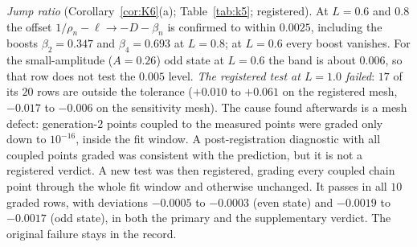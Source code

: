 \documentclass[11pt]{amsart}
\theoremstyle{definition}
\theoremstyle{remark}
\numberwithin{equation}{section}
\begin{document}
\emph{Jump ratio} (Corollary~\ref{cor:K6}(a); Table~\ref{tab:k5}; registered). At $L=0.6$ and $0.8$ the offset $1/\rho_n-\ell\to-D-\beta_n$ is confirmed to within $0.0025$, including the boosts $\beta_2=0.347$ and $\beta_4=0.693$ at $L=0.8$; at $L=0.6$ every boost vanishes. For the small-amplitude ($A=0.26$) odd state at $L=0.6$ the band is about $0.006$, so that row does not test the $0.005$ level. \emph{The registered test at $L=1.0$ failed}: $17$ of its $20$ rows are outside the tolerance ($+0.010$ to $+0.061$ on the registered mesh, $-0.017$ to $-0.006$ on the sensitivity mesh). The cause found afterwards is a mesh defect: generation-$2$ points coupled to the measured points were graded only down to $10^{-16}$, inside the fit window. A post-registration diagnostic with all coupled points graded was consistent with the prediction, but it is not a registered verdict. A new test was then registered, grading every coupled chain point through the whole fit window and otherwise unchanged. It passes in all $10$ graded rows, with deviations $-0.0005$ to $-0.0003$ (even state) and $-0.0019$ to $-0.0017$ (odd state), in both the primary and the supplementary verdict. The original failure stays in the record.
\end{document}
